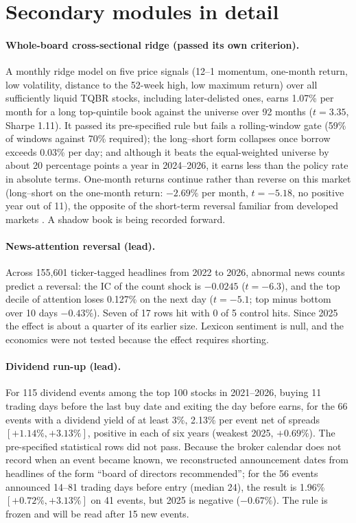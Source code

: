 \section{Secondary modules in detail}\label{app:secondary}

\paragraph{Whole-board cross-sectional ridge (passed its own criterion).} A monthly ridge model on five price signals (12--1 momentum, one-month return, low volatility, distance to the 52-week high, low maximum return) over all sufficiently liquid TQBR stocks, including later-delisted ones, earns 1.07\% per month for a long top-quintile book against the universe over 92 months ($t=3.35$, Sharpe 1.11). It passed its pre-specified rule but fails a rolling-window gate (59\% of windows against 70\% required); the long--short form collapses once borrow exceeds 0.03\% per day; and although it beats the equal-weighted universe by about 20 percentage points a year in 2024--2026, it earns less than the policy rate in absolute terms. One-month returns continue rather than reverse on this market (long--short on the one-month return: $-2.69\%$ per month, $t=-5.18$, no positive year out of 11), the opposite of the short-term reversal familiar from developed markets \citep{jegadeesh1990}. A shadow book is being recorded forward.

\paragraph{News-attention reversal (lead).} Across 155,601 ticker-tagged headlines from 2022 to 2026, abnormal news counts predict a reversal: the IC of the count shock is $-0.0245$ ($t=-6.3$), and the top decile of attention loses 0.127\% on the next day ($t=-5.1$; top minus bottom over 10 days $-0.43\%$). Seven of 17 rows hit with 0 of 5 control hits. Since 2025 the effect is about a quarter of its earlier size. Lexicon sentiment is null, and the economics were not tested because the effect requires shorting.

\paragraph{Dividend run-up (lead).} For 115 dividend events among the top 100 stocks in 2021--2026, buying 11 trading days before the last buy date and exiting the day before earns, for the 66 events with a dividend yield of at least 3\%, 2.13\% per event net of spreads $[+1.14\%,+3.13\%]$, positive in each of six years (weakest 2025, $+0.69\%$). The pre-specified statistical rows did not pass. Because the broker calendar does not record when an event became known, we reconstructed announcement dates from headlines of the form ``board of directors recommended''; for the 56 events announced 14--81 trading days before entry (median 24), the result is 1.96\% $[+0.72\%,+3.13\%]$ on 41 events, but 2025 is negative ($-0.67\%$). The rule is frozen and will be read after 15 new events.

